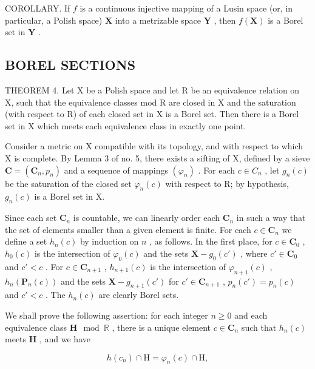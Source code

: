 COROLLARY. If \(f\) is a continuous injective mapping of a Lusin space (or, in particular, a Polish space) \(\mathbf{X}\) into a metrizable space \(\mathbf{Y}\) , then \(f(\mathbf{X})\) is a Borel set in \(\mathbf{Y}\) .

\subsection{BOREL SECTIONS}

THEOREM 4. Let X be a Polish space and let R be an equivalence relation on X, such that the equivalence classes mod R are closed in X and the saturation (with respect to R) of each closed set in X is a Borel set. Then there is a Borel set in X which meets each equivalence class in exactly one point.

Consider a metric on X compatible with its topology, and with respect to which X is complete. By Lemma 3 of no. 5, there exists a sifting of X, defined by a sieve \(\mathbf{C} = (\mathbf{C}_{n}, p_{n})\) and a sequence of mappings \((\varphi_{n})\) . For each \(c \in C_{n}\) , let \(g_{n}(c)\) be the saturation of the closed set \(\varphi_{n}(c)\) with respect to R; by hypothesis, \(g_{n}(c)\) is a Borel set in X.

Since each set \(\mathbf{C}_n\) is countable, we can linearly order each \(\mathbf{C}_n\) in such a way that the set of elements smaller than a given element is finite. For each \(c \in \mathbf{C}_n\) we define a set \(h_n(c)\) by induction on \(n\) , as follows. In the first place, for \(c \in \mathbf{C}_0\) , \(h_0(c)\) is the intersection of \(\varphi_0(c)\) and the sets \(\mathbf{X} - g_0(c')\) , where \(c' \in \mathbf{C}_0\) and \(c' < c\) . For \(c \in \mathbf{C}_{n+1}\) , \(h_{n+1}(c)\) is the intersection of \(\varphi_{n+1}(c)\) , \(h_n(\mathbf{P}_n(c))\) and the sets \(\mathbf{X} - g_{n+1}(c')\) for \(c' \in \mathbf{C}_{n+1}\) , \(p_n(c') = p_n(c)\) and \(c' < c\) . The \(h_n(c)\) are clearly Borel sets.

We shall prove the following assertion: for each integer \(n \geqslant 0\) and each equivalence class \(\mathbf{H} \mod \mathbb{R}\) , there is a unique element \(c \in \mathbf{C}_n\) such that \(h_n(c)\) meets \(\mathbf{H}\) , and we have

\[
h (c _ {n}) \cap \mathrm{H} = \varphi_ {n} (c) \cap \mathrm{H},
\]


